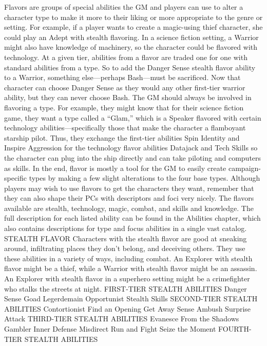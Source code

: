 Flavors are groups of special abilities the GM and players can use to alter a character type to make it more to their liking or more appropriate to the genre or setting. For example, if a player wants to create a magic-using thief character, she could play an Adept with stealth flavoring. In a science fiction setting, a Warrior might also have knowledge of machinery, so the character could be flavored with technology.
At a given tier, abilities from a flavor are traded one for one with standard abilities from a type. So to add the Danger Sense stealth flavor ability to a Warrior, something else—perhaps Bash—must be sacrificed. Now that character can choose Danger Sense as they would any other first-tier warrior ability, but they can never choose Bash.
The GM should always be involved in flavoring a type. For example, they might know that for their science fiction game, they want a type called a “Glam,” which is a Speaker flavored with certain technology abilities—specifically those that make the character a flamboyant starship pilot. Thus, they exchange the first-tier abilities Spin Identity and Inspire Aggression for the technology flavor abilities Datajack and Tech Skills so the character can plug into the ship directly and can take piloting and computers as skills.
In the end, flavor is mostly a tool for the GM to easily create campaign-specific types by making a few slight alterations to the four base types. Although players may wish to use flavors to get the characters they want, remember that they can also shape their PCs with descriptors and foci very nicely.
The flavors available are stealth, technology, magic, combat, and skills and knowledge. 
The full description for each listed ability can be found in the Abilities chapter, which also contains descriptions for type and focus abilities in a single vast catalog.
STEALTH FLAVOR
Characters with the stealth flavor are good at sneaking around, infiltrating places they don’t belong, and deceiving others. They use these abilities in a variety of ways, including combat. An Explorer with stealth flavor might be a thief, while a Warrior with stealth flavor might be an assassin. An Explorer with stealth flavor in a superhero setting might be a crimefighter who stalks the streets at night.
FIRST-TIER STEALTH ABILITIES
Danger Sense
Goad
Legerdemain
Opportunist
Stealth Skills
SECOND-TIER STEALTH ABILITIES
Contortionist
Find an Opening
Get Away
Sense Ambush
Surprise Attack
THIRD-TIER STEALTH ABILITIES
Evanesce
From the Shadows
Gambler
Inner Defense
Misdirect
Run and Fight
Seize the Moment
FOURTH-TIER STEALTH ABILITIES
